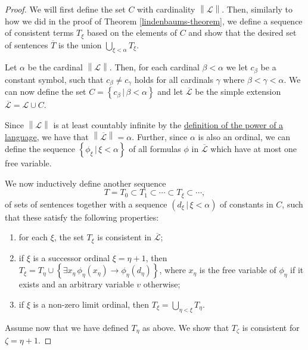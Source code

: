 \documentclass[../../main.tex]{subfiles}
\begin{document}
\begin{proof}
    We will first define the set $C$ with cardinality $\left\lVert \mathcal{L} \right\rVert$.
    Then, similarly to how we did in the proof of Theorem \ref{lindenbaums-theorem}, 
    we define a sequence of consistent terms $T_\xi$ based on the elements of $C$ and show that the desired set of sentences $\overline{T}$ is the union $\bigcup_{\xi < \alpha} T_\xi$.

    Let $\alpha$ be the cardinal $\left\lVert \mathcal{L}\right\rVert$.
    Then, for each cardinal $\beta < \alpha$ we let $c_\beta$ be a constant symbol, 
    such that $c_\beta \neq c_\gamma$ holds for all cardinals $\gamma$ where $\beta < \gamma < \alpha$.
    We can now define the set $C = \left\{c_\beta \,\vert\, \beta < \alpha\right\}$ 
    and let $\overline{\mathcal{L}}$ be the simple extension $\overline{\mathcal{L}} = \mathcal{L} \cup C$.

    Since $\left\lVert \mathcal{L}\right\rVert$ is at least countably infinite by the \hyperref[language-def]{definition of the power of a language},
    we have that $\left\lVert \overline{\mathcal{L}}\right\rVert = \alpha$.
    Further, since $\alpha$ is also an ordinal, 
    we can define the sequence $\left\{\phi_\xi \, \vert \, \xi < \alpha\right\}$ of all formulas $\phi$ in $\overline{\mathcal{L}}$ which have at most one free variable.

    We now inductively define another sequence
    $$T = T_0 \subset T_1 \subset \cdots \subset T_\xi \subset \cdots,$$
    of sets of sentences together with a sequence $\left(d_\xi \, \vert \, \xi < \alpha\right)$ of constants in $C$,
    such that these satisfy the following properties:
    \begin{enumerate}[label=(\roman*)]
        \item for each $\xi$, the set $T_\xi$ is consistent in $\overline{\mathcal{L}}$;
        \item if $\xi$ is a successor ordinal $\xi = \eta + 1$, 
        then $T_\xi = T_\eta \cup \left\{\exists x_\eta \, \phi_\eta(x_\eta) \rightarrow \phi_\eta(d_\eta)\right\}$,
        where $x_\eta$ is the free variable of $\phi_\eta$ if it exists and an arbitrary variable $v$ otherwise;
        \item if $\xi$ is a non-zero limit ordinal,
        then $T_\xi = \bigcup_{\eta < \xi} T_\eta$.
    \end{enumerate}

    Assume now that we have defined $T_\eta$ as above.
    We show that $T_\zeta$ is consistent for $\zeta = \eta + 1$.


\end{proof}
\end{document}
